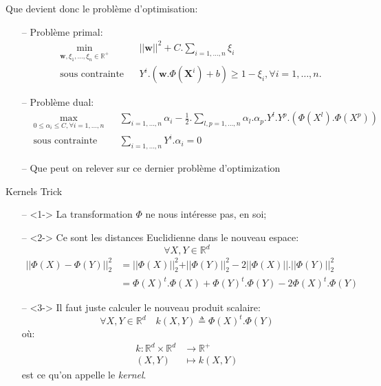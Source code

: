 \documentclass[9pt]{beamer}
\begin{document}
	\begin{frame}{Que devient donc le problème d'optimisation:}
		\begin{itemize}
			\item[--] Problème primal:
			\begin{equation}
				\begin{aligned}
				& \min_{\textbf{w}, \xi_1,\dots,\xi_n \in \mathbb{R}^+}
				& & {\vert\vert \textbf{w} \vert\vert}^2 + C.\sum_{i=1,\dots,n}\xi_i \\
				& \text{sous contrainte}
				& & Y^i.(\textbf{w}.\Phi(\textbf{X}^i) + b) \geq 1 - \xi_i , \forall i = 1, \dots, n.
				\end{aligned}
			\end{equation}
			\item[--] Problème dual:
			\begin{equation}
				\begin{aligned}
				& \max_{0 \leq \alpha_i \leq C ,\forall i=1,\dots,n}
				& & \sum_{i=1,\dots,n} \alpha_i - \frac{1}{2}.\sum_{l,p=1,\dots,n}\alpha_l.\alpha_p.Y^l.Y^p.(\Phi(X^l).\Phi(X^p))\\
				& \text{sous contrainte}
				& & \sum_{i=1,\dots,n}Y^i.\alpha_i=0
				\end{aligned}
			\end{equation}
			\item[--] Que peut on relever sur ce dernier problème d'optimization
		\end{itemize}
	\end{frame}

	\begin{frame}{Kernels Trick}
		\begin{itemize}
			\item[--]<1-> La transformation $\Phi$ ne nous intéresse pas, en soi;
			\item[--]<2-> Ce sont les distances Euclidienne dans le nouveau espace:
			$$\forall X, Y \in \mathbb{R}^d$$
			\begin{align*}
				\vert\vert\Phi(X) - \Phi(Y)\vert\vert_2^2 &= \vert\vert\Phi(X)\vert\vert_2^2 + \vert\vert\Phi(Y)\vert\vert_2^2 - 2 \vert\vert\Phi(X)\vert\vert.\vert\vert\Phi(Y)\vert\vert_2^2 \\
				 &= \Phi(X)^t.\Phi(X) + {\Phi(Y)}^t.\Phi(Y) - 2 {\Phi(X)}^t.\Phi(Y)
			\end{align*}
			\item[--]<3-> Il faut juste calculer le nouveau produit scalaire:
			\begin{equation}
				\forall X, Y \in \mathbb{R}^d \quad k(X, Y) \triangleq \Phi(X)^t.\Phi(Y)
			\end{equation}
			où:
			\begin{align*}
				k: \mathbb{R}^d \times \mathbb{R}^d &\rightarrow \mathbb{R}^+ \\
				(X, Y) &\mapsto k(X, Y)
			\end{align*}
			est ce qu'on appelle le \textit{kernel}.
		\end{itemize}
	\end{frame}
\end{document}

